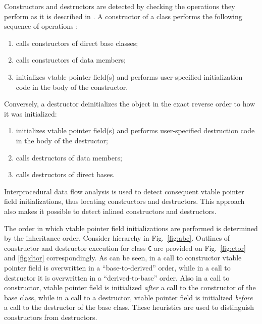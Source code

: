 \documentclass[10pt, conference, compsocconf]{IEEEtran}
\newcommand{\compact}{}
\newcommand{\skipspace}{}
\begin{document}
Constructors and destructors are detected by checking the operations they perform
as it is described in \cite{fokin10}.
A constructor of a class performs the following sequence
of operations \cite{cpp03, gray94}:
\skipspace\begin{enumerate}\compact
\item calls constructors of direct base classes;
\item calls constructors of data members;
\item initializes vtable pointer field(s) and
      performs user-specified initialization code in the body
      of the constructor.
\end{enumerate}

Conversely, a destructor deinitializes the object
in the exact reverse order to how it was initialized:
\skipspace\begin{enumerate}\compact
\item initializes vtable pointer field(s) and
    performs user-specified destruction code in the body of the destructor;
\item calls destructors of data members;
\item calls destructors of direct bases.
\end{enumerate}

Interprocedural data flow analysis is used to detect consequent 
vtable pointer field initializations, thus locating constructors
and destructors. This approach also makes it possible to detect 
inlined constructors and destructors.

The order in which vtable pointer field initializations are performed
is determined by the inheritance order. 
Consider hierarchy in Fig.~\ref{fig:abc}.
Outlines of constructor and destructor execution for class \lstinline{C} 
are provided on Fig.~\ref{fig:ctor} and \ref{fig:dtor} correspondingly. 
As can be seen, in a call to constructor vtable
pointer field is overwritten in a ``base-to-derived'' order,
while in a call to destructor it is overwritten in a
``derived-to-base'' order.
Also in a call to constructor, vtable pointer field is initialized \textit{after} a
call to the constructor of the base class, while in a call to a destructor,
vtable pointer field is initialized \textit{before} a call to the destructor of
the base class. 
These heuristics are used to distinguish constructors from destructors.

\end{document}
